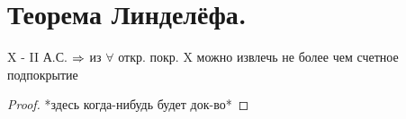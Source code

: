 \documentclass[geometry.tex]{subfiles}
\begin{document}
  \section{Теорема Линделёфа.}

  \begin{theorem}
      X - II А.С. $\Rightarrow$ из $\forall$ откр. покр. X можно извлечь не более чем счетное подпокрытие
  \end{theorem}

  \begin{proof}
      *здесь когда-нибудь будет док-во*
  \end{proof}
\end{document}
